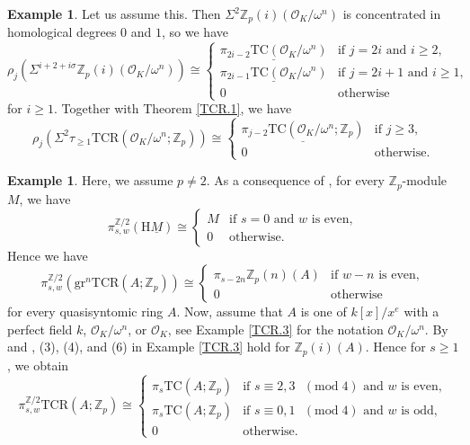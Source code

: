 \documentclass[10pt]{amsart}
\theoremstyle{definition}
\newtheorem{exm}[thm]{Example}
\numberwithin{equation}{section}
\newcommand{\Z}{\mathbb{Z}}
\newcommand{\cO}{\mathcal{O}}
\newcommand{\rH}{\mathrm{H}}
\newcommand{\ul}{\underline}
\newcommand{\gr}{\mathrm{gr}}
\newcommand{\TC}{\mathrm{TC}}
\newcommand{\TCR}{\mathrm{TCR}}
\begin{document}
{\begin{exm}
Let us assume this. Then $\Sigma^2\Z_p(i)(\cO_K/\omega^n)$ is concentrated in homological degrees $0$ and $1$,
so we have
\[
\rho_j(\Sigma^{i+2+i\sigma} \Z_p(i)(\cO_K/\omega^n))
\cong
\left\{
\begin{array}{ll}
\underline{\pi_{2i-2}\TC(\cO_K/\omega^n)}&
\text{if $j=2i$ and $i\geq 2$},
\\
\underline{\pi_{2i-1}\TC(\cO_K/\omega^n)}&
\text{if $j=2i+1$ and $i\geq 1$},
\\
0 &
\text{otherwise}
\end{array}
\right.
\]
for $i\geq 1$.
Together with Theorem \ref{TCR.1},
we have
\[
\rho_j (\Sigma^{2}\tau_{\geq 1}\TCR(\cO_K/\omega^n;\Z_p))
\cong
\left\{
\begin{array}{ll}
\ul{\pi_{j-2}\TC(\cO_K/\omega^n;\Z_p)}&
\text{if $j\geq 3$},
\\
0& \text{otherwise}.
\end{array}
\right.
\]
\end{exm}


\begin{exm}
Here, we assume $p\neq 2$.
As a consequence of  \cite[Theorem 2.8(a)]{Dug05},
for every $\Z_p$-module $M$,
we have
\[
\pi_{s,w}^{\Z/2}(\rH \ul{M})
\cong
\left\{
\begin{array}{ll}
M & \text{if $s=0$ and $w$ is even},
\\
0 & \text{otherwise.}
\end{array}
\right.
\]
Hence
we have
\[
\pi_{s,w}^{\Z/2}(\gr^n\TCR(A;\Z_p))
\cong
\left\{
\begin{array}{ll}
\pi_{s-2n} \Z_p(n)(A) & \text{if $w-n$ is even},
\\
0 & \text{otherwise}
\end{array}
\right.
\]
for every quasisyntomic ring $A$.
Now,
assume that $A$ is one of $k[x]/x^e$ with a perfect field $k$, $\cO_K/\omega^n$, or $\cO_K$,
see Example \ref{TCR.3} for the notation $\cO_K/\omega^n$.
By \cite[Theorem 1.1]{MR4632370} and \cite[Corollary 2.13, Remark 2.17]{AKN},
(3), (4), and (6) in Example \ref{TCR.3} hold for $\Z_p(i)(A)$.
Hence for $s\geq 1$,
we obtain
\[
\pi_{s,w}^{\Z/2}\TCR(A;\Z_p)
\cong
\left\{
\begin{array}{ll}
\pi_s \TC(A;\Z_p)& \text{if $s\equiv 2,3$ $(\mathrm{mod}\; 4)$ and $w$ is even},
\\
\pi_s \TC(A;\Z_p)& \text{if $s\equiv 0,1$ $(\mathrm{mod}\; 4)$ and $w$ is odd},
\\
0 & \text{otherwise}.
\end{array}
\right.
\]
\end{exm}


}
\end{document}
